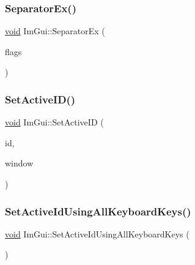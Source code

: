\mbox{\label{namespaceImGui_ae997d49ef4c09fb4934befb88c3c94c2}} 
\subsubsection{\texorpdfstring{Separator\+Ex()}{SeparatorEx()}}
{\footnotesize\ttfamily \hyperlink{imgui__impl__opengl3__loader_8h_ac668e7cffd9e2e9cfee428b9b2f34fa7}{void} Im\+Gui\+::\+Separator\+Ex (\begin{DoxyParamCaption}\item[{\hyperlink{imgui__internal_8h_a5bfe5a88609ebcdf61cfee4e2fabf9a8}{Im\+Gui\+Separator\+Flags}}]{flags }\end{DoxyParamCaption})}

\mbox{\label{namespaceImGui_a27b8ace13a8c421ee8405f0cbebe4ead}} 
\subsubsection{\texorpdfstring{Set\+Active\+I\+D()}{SetActiveID()}}
{\footnotesize\ttfamily \hyperlink{imgui__impl__opengl3__loader_8h_ac668e7cffd9e2e9cfee428b9b2f34fa7}{void} Im\+Gui\+::\+Set\+Active\+ID (\begin{DoxyParamCaption}\item[{Im\+Gui\+ID}]{id,  }\item[{\hyperlink{structImGuiWindow}{Im\+Gui\+Window} $\ast$}]{window }\end{DoxyParamCaption})}

\mbox{\label{namespaceImGui_a5e5b2b1969b119d6932116f28fbd4d53}} 
\subsubsection{\texorpdfstring{Set\+Active\+Id\+Using\+All\+Keyboard\+Keys()}{SetActiveIdUsingAllKeyboardKeys()}}
{\footnotesize\ttfamily \hyperlink{imgui__impl__opengl3__loader_8h_ac668e7cffd9e2e9cfee428b9b2f34fa7}{void} Im\+Gui\+::\+Set\+Active\+Id\+Using\+All\+Keyboard\+Keys (\begin{DoxyParamCaption}{ }\end{DoxyParamCaption})}

